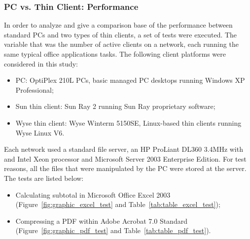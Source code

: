 {            \subsubsection*{PC vs. Thin Client: Performance}
                In order to analyze and give a comparison base of the performance between standard PCs and two types of thin clients, a set of tests were executed. The variable that was the number of active clients on a network, each running the same typical office applications tasks. The following client platforms were considered in this study:
                \begin{itemize}
                    \item PC: OptiPlex 210L PCs, basic managed PC desktops running Windows XP Professional;
                    \item Sun thin client: Sun Ray 2 running Sun Ray proprietary software;
                    \item Wyse thin client: Wyse Winterm 5150SE, Linux-based thin clients running Wyse Linux V6.
                \end{itemize}
                Each network used a standard file server, an HP ProLiant DL360 3.4MHz with and Intel Xeon processor and Microsoft Server 2003 Enterprise Edition. For test reasons, all the files that were manipulated by the PC were stored at the server. The tests are listed below:
                \begin{itemize}
                    \item Calculating subtotal in Microsoft Office Excel 2003 (Figure~\ref{fig:graphic_excel_test} and Table~\ref{tab:table_excel_test});
                    \item Compressing a PDF within Adobe Acrobat 7.0 Standard (Figure~\ref{fig:graphic_pdf_test} and Table~\ref{tab:table_pdf_test}).
                \end{itemize}
                
}
